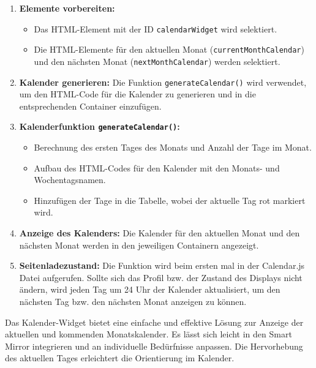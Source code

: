 \begin{enumerate}
    \item \textbf{Elemente vorbereiten:}
    \begin{itemize}
        \item Das HTML-Element mit der ID \texttt{calendarWidget} wird selektiert.
        \item Die HTML-Elemente für den aktuellen Monat (\texttt{currentMonthCalendar}) und den nächsten Monat (\texttt{nextMonthCalendar}) werden selektiert.
    \end{itemize}

    \item \textbf{Kalender generieren:}
    Die Funktion \texttt{generateCalendar()} wird verwendet, um den HTML-Code für die Kalender zu generieren und in die entsprechenden Container einzufügen.
    
    \item \textbf{Kalenderfunktion \texttt{generateCalendar()}:}
    \begin{itemize}
        \item Berechnung des ersten Tages des Monats und Anzahl der Tage im Monat.
        \item Aufbau des HTML-Codes für den Kalender mit den Monats- und Wochentagsnamen.
        \item Hinzufügen der Tage in die Tabelle, wobei der aktuelle Tag rot markiert wird.
    \end{itemize}

    \item \textbf{Anzeige des Kalenders:}
    Die Kalender für den aktuellen Monat und den nächsten Monat werden in den jeweiligen Containern angezeigt.

 \item \textbf{Seitenladezustand:}
    Die Funktion wird beim ersten mal in der Calendar.js Datei aufgerufen. Sollte sich das Profil bzw. der Zustand des Displays nicht ändern, wird jeden Tag um 24 Uhr der Kalender aktualisiert, um den nächsten Tag  bzw. den nächsten Monat anzeigen zu können.
\end{enumerate}

\noindent
Das Kalender-Widget bietet eine einfache und effektive Lösung zur Anzeige der aktuellen und kommenden Monatskalender. Es lässt sich leicht in den Smart Mirror integrieren und an individuelle Bedürfnisse anpassen. Die Hervorhebung des aktuellen Tages erleichtert die Orientierung im Kalender.

\newpage

